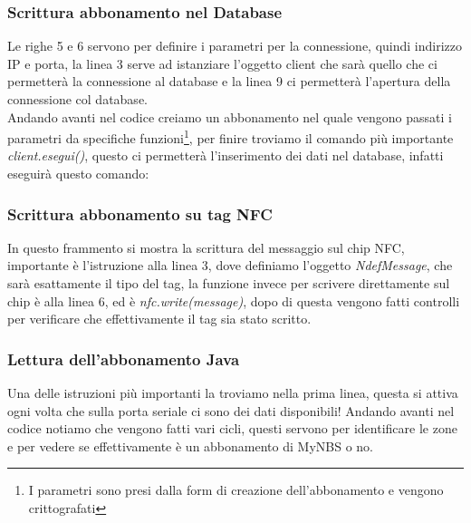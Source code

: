 \subsubsection{Scrittura abbonamento nel Database}


Le righe 5 e 6 servono per definire i parametri per la connessione, quindi indirizzo IP e porta, la linea 3 serve ad istanziare l'oggetto client che sarà quello che ci permetterà la connessione al database e la linea 9 ci permetterà l'apertura della connessione col database.
\\Andando avanti nel codice creiamo un abbonamento nel quale vengono passati i parametri da specifiche funzioni\footnote{I parametri sono presi dalla form di creazione dell'abbonamento e vengono crittografati}, per finire troviamo il comando più importante \textit{client.esegui()}, questo ci permetterà l'inserimento dei dati nel database, infatti eseguirà questo comando:
\begin{center}

\end{center}
\subsubsection{Scrittura abbonamento su tag NFC }


In questo frammento si mostra la scrittura del messaggio sul chip NFC, importante è l'istruzione alla linea 3, dove definiamo l'oggetto \textit{NdefMessage}, che sarà esattamente il tipo del tag, la funzione invece per scrivere direttamente sul chip è alla linea 6, ed è \textit{nfc.write(message)}, dopo di questa vengono fatti controlli per verificare che effettivamente il tag sia stato scritto.
\subsubsection{Lettura dell'abbonamento Java}


Una delle istruzioni più importanti la troviamo nella prima linea, questa si attiva ogni volta che sulla porta seriale ci sono dei dati disponibili! Andando avanti nel codice notiamo che vengono fatti vari cicli, questi servono per identificare le zone e per vedere se effettivamente è un abbonamento di MyNBS o no.